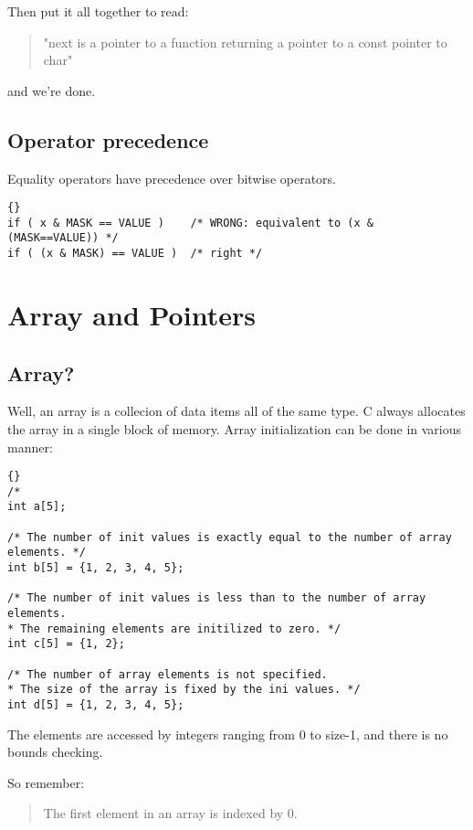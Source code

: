 \documentclass{report}
\begin{document}
Then put it all together to read:
\begin{quote}
"next is a pointer to a function returning a pointer to a const pointer to char"
\end{quote}
and we're done.


\section{Operator precedence}
Equality operators have precedence over bitwise operators.
\begin{lstlisting}{}
if ( x & MASK == VALUE )    /* WRONG: equivalent to (x & (MASK==VALUE)) */
if ( (x & MASK) == VALUE )  /* right */
\end{lstlisting}


\chapter{Array and Pointers}


\section{Array?}

Well, an array is a collecion of data items all of the same type.
C always allocates the array in a single block of memory.
Array initialization can be done in various manner:
\begin{lstlisting}{}
/* 
int a[5];

/* The number of init values is exactly equal to the number of array elements. */
int b[5] = {1, 2, 3, 4, 5};

/* The number of init values is less than to the number of array elements.
* The remaining elements are initilized to zero. */
int c[5] = {1, 2};

/* The number of array elements is not specified. 
* The size of the array is fixed by the ini values. */
int d[5] = {1, 2, 3, 4, 5};
\end{lstlisting}
The elements are accessed by integers ranging from 0 to size-1, and there is no bounds checking.

So remember:
\begin{quote}
The first element in an array is indexed by 0.
\end{quote}
\end{document}

